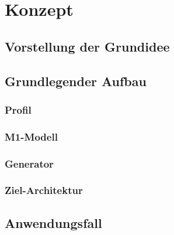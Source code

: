 \section{Konzept}
\subsection{Vorstellung der Grundidee}
\subsection{Grundlegender Aufbau}
\subsubsection{Profil}
\subsubsection{M1-Modell}
\subsubsection{Generator}
\subsubsection{Ziel-Architektur}
\subsection{Anwendungsfall}